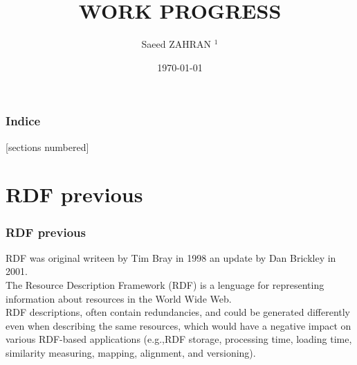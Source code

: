 \documentclass{beamer}
\title{WORK PROGRESS}
\author{Saeed ZAHRAN $^{1}$ }
\institute{$^{1}$UNIVERSITÉ DE PICARDIE JULES VERNE \\ 
		}
\date{\today}
\numberwithin{figure}{section}
\numberwithin{equation}{section}
\begin{document}

\begin{frame}[plain,t]
\titlepage
\end{frame}


\begin{frame}
  \addtocounter{framenumber}{-1}
  \scriptsize
  \frametitle{Indice}
  [sections numbered]
  \tableofcontents[hideallsubsections]
\end{frame}


\section{RDF previous }
\begin{frame}
 \frametitle{RDF previous }
 \scriptsize
 \justifying
  RDF was original writeen by Tim Bray in 1998 an update by Dan Brickley in 2001\cite{w3:2004:w3c}.\\ 
  \vspace{5mm}
  The Resource Description Framework (RDF) is a lenguage for representing information about resources in the World Wide Web\cite{w3:2004:w3c}.\\
  \vspace{5mm}
 RDF descriptions, often contain redundancies, and could be generated differently even when describing the same resources, which would have a negative impact on various RDF-based applications (e.g.,RDF storage, processing time, loading time, similarity measuring, mapping, alignment, and versioning)\cite{TiconaUltimo}.

\end{frame}

\end{document}
